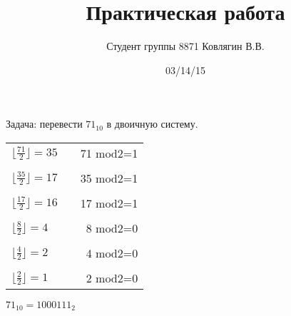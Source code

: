\documentclass[a4paper, 11pt]{article}
\title{Практическая работа}
\author{Студент группы 8871 Ковлягин В.В.}
\date{03/14/15}
\begin{document}
  Задача: перевести $71_{10}$ в двоичную систему.
\begin{center}
\begin{tabular}{ l c r }
  $\lfloor\frac{71}{2}\rfloor=35$ &  & 71 mod2=1 \\
  \\
  $\lfloor\frac{35}{2}\rfloor=17$ &  & 35 mod2=1 \\
  \\
  $\lfloor\frac{17}{2}\rfloor=16$ &  & 17 mod2=1 \\
  \\
  $\lfloor\frac{8}{2}\rfloor=4$   &  & 8 mod2=0 \\
  \\
  $\lfloor\frac{4}{2}\rfloor=2$   &  & 4 mod2=0 \\
  \\
  $\lfloor\frac{2}{2}\rfloor=1$   &  & 2 mod2=0 \\
\end{tabular}
\end{center}
$71_{10} = 1000111_{2}$
\end{document}
